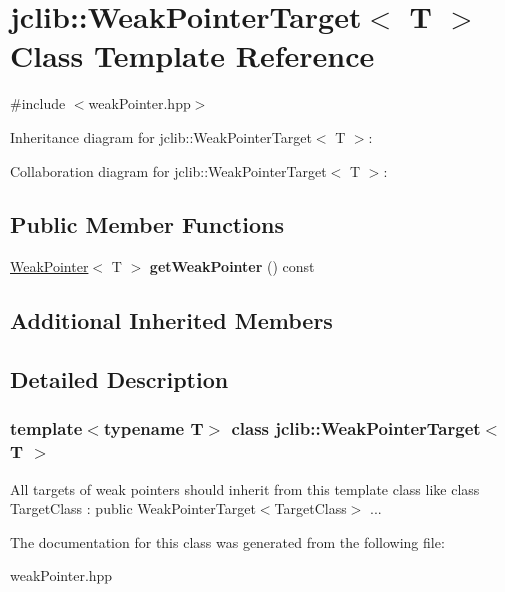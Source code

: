 \hypertarget{classjclib_1_1WeakPointerTarget}{}\section{jclib\+:\+:Weak\+Pointer\+Target$<$ T $>$ Class Template Reference}
\label{classjclib_1_1WeakPointerTarget}


{\ttfamily \#include $<$weak\+Pointer.\+hpp$>$}



Inheritance diagram for jclib\+:\+:Weak\+Pointer\+Target$<$ T $>$\+:


Collaboration diagram for jclib\+:\+:Weak\+Pointer\+Target$<$ T $>$\+:
\subsection*{Public Member Functions}
\begin{DoxyCompactItemize}
\item 
\mbox{\label{classjclib_1_1WeakPointerTarget_a19ad5505e9387e67f41be6f2aedf8cce}} 
\hyperlink{classjclib_1_1WeakPointer}{Weak\+Pointer}$<$ T $>$ {\bfseries get\+Weak\+Pointer} () const
\end{DoxyCompactItemize}
\subsection*{Additional Inherited Members}


\subsection{Detailed Description}
\subsubsection*{template$<$typename T$>$\newline
class jclib\+::\+Weak\+Pointer\+Target$<$ T $>$}

All targets of weak pointers should inherit from this template class like class Target\+Class \+: public Weak\+Pointer\+Target$<$\+Target\+Class$>$ ... 

The documentation for this class was generated from the following file\+:\begin{DoxyCompactItemize}
\item 
weak\+Pointer.\+hpp\end{DoxyCompactItemize}

